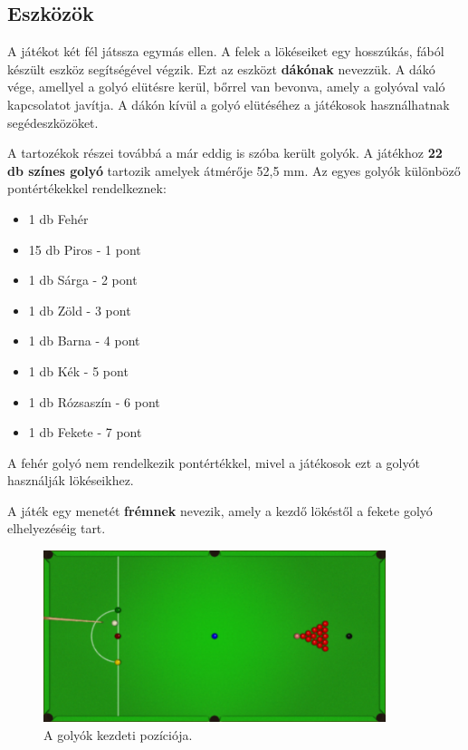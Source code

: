 \subsection{Eszközök}
A játékot két fél játssza egymás ellen. A felek a lökéseiket egy hosszúkás, fából készült eszköz segítségével végzik. Ezt az eszközt \textbf{dákónak} nevezzük. A dákó vége, amellyel a golyó elütésre kerül, bőrrel van bevonva, amely a golyóval való kapcsolatot javítja. A dákón kívül a golyó elütéséhez a játékosok használhatnak segédeszközöket.
\par A tartozékok részei továbbá a már eddig is szóba került golyók. A játékhoz \textbf{22 db színes golyó} tartozik amelyek átmérője 52,5 mm.\cite{snooker_rules}
\newline Az egyes golyók különböző pontértékekkel rendelkeznek:\cite{snooker_rules}
\begin{itemize}
    \setlength\itemsep{-2pt}
    \item 1 db Fehér
    \item 15 db Piros - 1 pont
    \item 1 db Sárga - 2 pont
    \item 1 db Zöld - 3 pont
    \item 1 db Barna - 4 pont
    \item 1 db Kék - 5 pont
    \item 1 db Rózsaszín - 6 pont
    \item 1 db Fekete - 7 pont
\end{itemize}
A fehér golyó nem rendelkezik pontértékkel, mivel a játékosok ezt a golyót használják lökéseikhez.
\par A játék egy menetét \textbf{frémnek} nevezik, amely a kezdő lökéstől a fekete golyó elhelyezéséig tart.\cite{snooker_rules}
\begin{figure}[!ht]
    \centering
    \includegraphics[width=100mm, keepaspectratio]{figures/starting_position.png}
    \caption{A golyók kezdeti pozíciója.}
    \label{fig:kezdeti_pozicio}
\end{figure}

